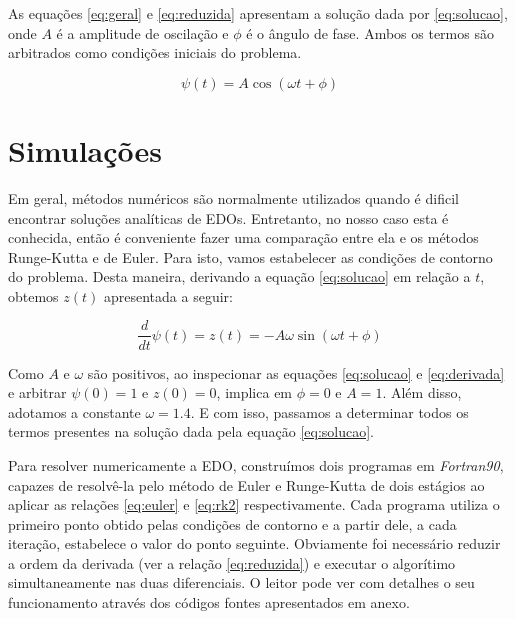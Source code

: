 \documentclass[
		12pt,            %
		a4paper
	      ]  
	      {article}          %
\begin{document}
	As equações \ref{eq:geral} e \ref{eq:reduzida} apresentam a solução dada por \ref{eq:solucao}, onde 
	$A$ é a amplitude de oscilação e $\phi$ é o ângulo de fase. Ambos os termos são arbitrados como
	condições iniciais do problema.

	\vspace{-10mm}
	\begin{equation}\label{eq:solucao}
		\psi(t)=A\cos(\omega t + \phi)
	\end{equation}
	\vspace{-15mm}

	\section{Simulações}

	Em geral, métodos numéricos são normalmente utilizados quando é dificil encontrar soluções analíticas 
	de EDOs. Entretanto, no nosso caso esta é conhecida, então é  conveniente fazer uma comparação entre ela 
	e os métodos Runge-Kutta e de Euler. Para isto, vamos estabelecer as condições de contorno do problema. 
	Desta maneira, derivando a equação \ref{eq:solucao} em relação a $t$, obtemos $z(t)$ apresentada a seguir:
	
	\vspace{-5mm}
	\begin{equation}\label{eq:derivada}
		\frac{d}{dt}\psi(t)= z(t) = -A \omega \sin(\omega t + \phi)
	\end{equation}

	Como $A$ e $\omega$ são positivos, ao inspecionar as equações \ref{eq:solucao} e \ref{eq:derivada} 
	e arbitrar $\psi(0) = 1$ e $z(0) = 0$, implica em $\phi = 0$ e $A = 1$. Além disso, adotamos a constante 
	$\omega = 1.4$. E com isso, passamos a determinar todos os termos presentes na solução dada pela equação 
	\ref{eq:solucao}.\par
	
	Para resolver numericamente a EDO, construímos dois programas em {\it Fortran90}, capazes de resolvê-la 
	pelo método de Euler e Runge-Kutta de dois estágios ao aplicar as relações \ref{eq:euler} e \ref{eq:rk2} 
	respectivamente. Cada programa utiliza o primeiro ponto obtido pelas condições de contorno e a partir dele, 
	a cada iteração, estabelece o valor do ponto seguinte. Obviamente foi necessário reduzir a ordem da derivada 
	(ver a relação \ref{eq:reduzida}) e executar o algorítimo simultaneamente nas duas diferenciais. O leitor 
	pode ver com detalhes o seu funcionamento através dos códigos fontes apresentados em anexo.
	
\end{document}
